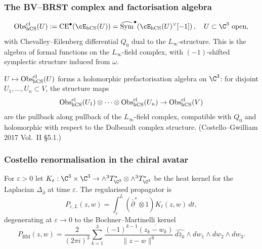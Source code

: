 \subsubsection{The BV--BRST complex and factorisation algebra}
\label{sssec:BV-BRST-factorisation}

\begin{definition}
\label{def:classical-obs-CE-avatar}
\[
\mathrm{Obs}^{\mathrm{cl}}_{\hCS}(U) := \mathrm{CE}^\bullet(\cE_{\hCS}(U)) = \widehat{\mathrm{Sym}}^\bullet\!\left(\cE_{\hCS}(U)^\vee[-1]\right), \quad U \subset \C^3 \text{ open},
\]
with Chevalley--Eilenberg differential $Q_0$ dual to the $L_\infty$-structure. This is the algebra of formal functions on the $L_\infty$-field complex, with $(-1)$-shifted symplectic structure induced from $\omega$.
\end{definition}

\begin{theorem}
\label{thm:classical-prefact-avatar}
$U \mapsto \mathrm{Obs}^{\mathrm{cl}}_{\mathrm{hCS}}(U)$ forms a holomorphic prefactorisation algebra on $\C^3$: for disjoint $U_1, \ldots, U_n \subset V$, the structure maps
\[
\mathrm{Obs}^{\mathrm{cl}}_{\mathrm{hCS}}(U_1) \otimes \cdots \otimes \mathrm{Obs}^{\mathrm{cl}}_{\mathrm{hCS}}(U_n) \to \mathrm{Obs}^{\mathrm{cl}}_{\mathrm{hCS}}(V)
\]
are the pullback along pullback of the $L_\infty$-field complex, compatible with $Q_0$ and holomorphic with respect to the Dolbeault complex structure. (Costello--Gwilliam 2017 Vol.~II §5.1.)
\end{theorem}

\subsubsection{Costello renormalisation in the chiral avatar}
\label{sssec:costello-renormalisation-avatar}

\begin{definition}
\label{def:heat-kernel-avatar}
For $\varepsilon > 0$ let $K_\varepsilon : \C^3 \times \C^3 \to \wedge^3 T^*_{\C^3} \otimes \wedge^3 T^*_{\C^3}$ be the heat kernel for the Laplacian $\Delta_{\bar\partial}$ at time $\varepsilon$. The regularised propagator is
\[
P_{\varepsilon, L}(z, w) = \int_\varepsilon^L (\bar\partial^* \otimes 1) K_t(z, w) \, dt,
\]
degenerating at $\varepsilon \to 0$ to the Bochner--Martinelli kernel
\[
P_{\mathrm{BM}}(z, w) = \frac{2}{(2\pi i)^3} \sum_{k=1}^{3} \frac{(-1)^{k-1} \overline{(z_k - w_k)}}{\|z - w\|^6} \, \widehat{d\bar z_k} \wedge dw_1 \wedge dw_2 \wedge dw_3.
\]
\end{definition}

